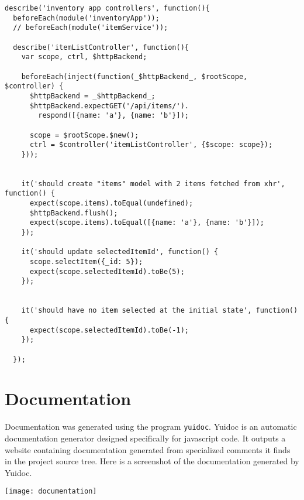 \documentclass[letterpaper, 12pt]{article}
\begin{document}
\begingroup
    \fontsize{10pt}{12pt}\selectfont
\vspace{-3mm}\begin{verbatim}
describe('inventory app controllers', function(){
  beforeEach(module('inventoryApp'));
  // beforeEach(module('itemService'));

  describe('itemListController', function(){
    var scope, ctrl, $httpBackend;

    beforeEach(inject(function(_$httpBackend_, $rootScope, $controller) {
      $httpBackend = _$httpBackend_;
      $httpBackend.expectGET('/api/items/').
        respond([{name: 'a'}, {name: 'b'}]);

      scope = $rootScope.$new();
      ctrl = $controller('itemListController', {$scope: scope});
    }));


    it('should create "items" model with 2 items fetched from xhr', function() {
      expect(scope.items).toEqual(undefined);
      $httpBackend.flush();
      expect(scope.items).toEqual([{name: 'a'}, {name: 'b'}]);
    });

    it('should update selectedItemId', function() {
      scope.selectItem({_id: 5});
      expect(scope.selectedItemId).toBe(5);
    });


    it('should have no item selected at the initial state', function() {
      expect(scope.selectedItemId).toBe(-1);
    });

  });
\end{verbatim}
\endgroup

\section{Documentation}
Documentation was generated using the program \texttt{yuidoc}.  Yuidoc is an automatic documentation generator designed specifically for javascript code.  It outputs a website containing documentation generated from specialized comments it finds in the project source tree. Here is a screenshot of the documentation generated by Yuidoc.

	\begin{centering}
	\texttt{[image: documentation]}
    \end{centering}
\end{document}
